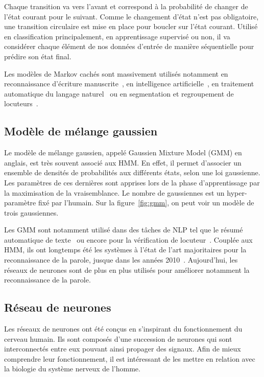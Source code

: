 

Chaque transition va vers l'avant et correspond à la probabilité de changer de l'état courant pour le suivant. Comme le changement d'état n'est pas obligatoire, une transition circulaire est mise en place pour boucler sur l'état courant.
Utilisé en classification principalement, en apprentissage supervisé ou non, il va considérer chaque élément de nos données d'entrée de manière séquentielle pour prédire son état final.

Les modèles de Markov cachés sont massivement utilisés notamment en reconnaissance d'écriture manuscrite~\cite{Hu1996}, en intelligence artificielle~\cite{Gales2008}, en traitement automatique du langage naturel~\cite{Campbell2006} ou en segmentation et regroupement de locuteurs~\cite{Ajmera2002}.

\subsection{Modèle de mélange gaussien}
Le modèle de mélange gaussien, appelé Gaussien Mixture Model (GMM) en anglais, est très souvent associé aux HMM. En effet, il permet d'associer un ensemble de densités de probabilités aux différents états, selon une loi gaussienne. Les paramètres de ces dernières sont apprises lors de la phase d'apprentissage par la maximisation de la vraisemblance. Le nombre de gaussiennes est un hyper-paramètre fixé par l'humain. Sur la figure~\ref{fig:gmm}, on peut voir un modèle de trois gaussiennes.



Les GMM sont notamment utilisé dans des tâches de NLP tel que le résumé automatique de texte~\cite{Fattah2009} ou encore pour la vérification de locuteur~\cite{Baker2005}. Couplée aux HMM, ils ont longtemps été les systèmes à l'état de l'art majoritaires pour la reconnaissance de la parole, jusque dans les années 2010~\cite{Hinton2012}. Aujourd'hui, les réseaux de neurones sont de plus en plus utilisés pour améliorer notamment la reconnaissance de la parole.

\subsection{Réseau de neurones}
Les réseaux de neurones ont été conçus en s'inspirant du fonctionnement du cerveau humain. Ils sont composés d'une succession de neurones qui sont interconnectés entre eux pouvant ainsi propager des signaux.
Afin de mieux comprendre leur fonctionnement, il est intéressant de les mettre en relation avec la biologie du système nerveux de l'homme.

